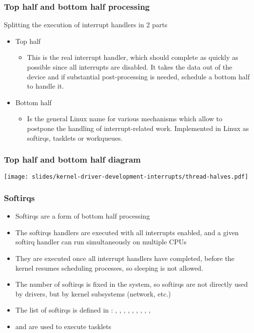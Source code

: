 \begin{frame}
  \frametitle{Top half and bottom half processing}
  Splitting the execution of interrupt handlers in 2 parts
  \begin{itemize}
  \item Top half
    \begin{itemize}
    \item This is the real interrupt handler, which should complete
      as quickly as possible since all interrupts are disabled.
      It takes the data out of the device and if substantial
      post-processing is needed, schedule a bottom half to handle it.
    \end{itemize}
  \item Bottom half
    \begin{itemize}
    \item Is the general Linux name for various mechanisms which
      allow to postpone the handling of interrupt-related
      work. Implemented in Linux as softirqs, tasklets or
      workqueues.
    \end{itemize}
  \end{itemize}
\end{frame}

\begin{frame}
  \frametitle{Top half and bottom half diagram}
  \begin{center}
    \texttt{[image: slides/kernel-driver-development-interrupts/thread-halves.pdf]}
  \end{center}
\end{frame}

\begin{frame}
  \frametitle{Softirqs}
  \begin{itemize}
  \item Softirqs are a form of bottom half processing
  \item The softirqs handlers are executed with all interrupts
    enabled, and a given softirq handler can run simultaneously on
    multiple CPUs
  \item They are executed once all interrupt handlers have completed,
    before the kernel resumes scheduling processes, so sleeping is not
    allowed.
  \item The number of softirqs is fixed in the system, so softirqs are
    not directly used by drivers, but by kernel subsystems (network,
    etc.)
  \item The list of softirqs is defined in
    : , ,
    , , ,
    , ,
    , , 
  \item {} and  are used to execute
    tasklets
  \end{itemize}
\end{frame}

